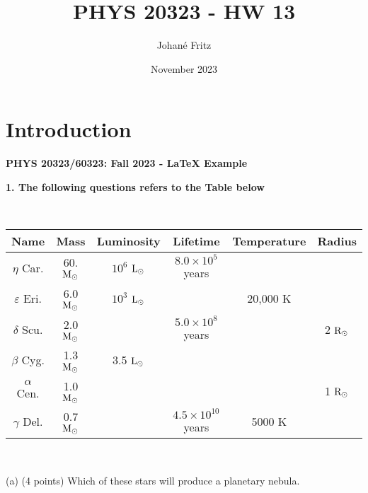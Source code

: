 \documentclass{article}
\title{PHYS 20323 - HW 13}
\author{Johané Fritz}
\date{November 2023}
\begin{document}
\maketitle

\section{Introduction}

\pagebreak 

\begin{center}
\textbf{{\Large PHYS 20323/60323: Fall 2023 - LaTeX Example}} \\
\end{center}

\textbf{{\large 1. The following questions refers to the Table below}} 

\vspace{6pt}

\\

\hspace{0.7cm}\begin{tabular}{|c|c|c|c|c|c|}
\hline
Name & Mass & Luminosity & Lifetime & Temperature & Radius \\
\hline
$\eta$ Car. & 60. \(\textup{M}_\odot\) & $10^6$ \(\textup{L}_\odot\) & $8.0\times10^5$ years & & \\
\hline
$\varepsilon$ Eri. & 6.0 \(\textup{M}_\odot\) & $10^3$ \(\textup{L}_\odot\) & & 20,000 K & \\
\hline
$\delta$ Scu. & 2.0  \(\textup{M}_\odot\) & & $5.0\times10^8$ years & & 2 \(\textup{R}_\odot\) \\
\hline
$\beta$ Cyg. & 1.3 \(\textup{M}_\odot\) & 3.5 \(\textup{L}_\odot\) & & & \\
\hline
$\alpha$ Cen. & 1.0 \(\textup{M}_\odot\) & & & & 1 \(\textup{R}_\odot\) \\
\hline
$\gamma$ Del. & 0.7 \(\textup{M}_\odot\) & & $4.5\times10^10$ years & 5000 K & \\
\hline 
\end{tabular} \\

\vspace{10pt}

\hspace{0.7cm} (a) (4 points) Which of these stars will produce a planetary nebula. \\
\end{document}
